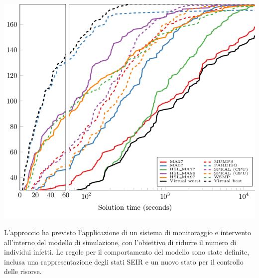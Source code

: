 \begin{minipage}{\linewidth}
    \centering
    \includegraphics[width=\textwidth]{img/Comparison-of-Ipopt-performance-over-various-linear-solvers-using-the-two-dimensional.png}
    \label{fig:Ipopt_solver}
\end{minipage}

L'approccio ha previsto l'applicazione di un sistema di 
monitoraggio e intervento all'interno del modello di simulazione, 
con l'obiettivo di ridurre il numero di individui infetti. 
Le regole per il comportamento del modello sono state definite, 
inclusa una rappresentazione degli stati SEIR e un nuovo stato per 
il controllo delle risorse.


